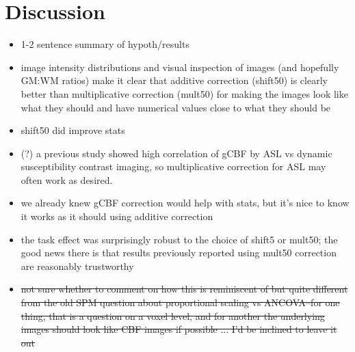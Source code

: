 \section{Discussion}

\begin{itemize}
\item 1-2 sentence summary of hypoth/results
\item image intensity distributions and visual inspection of images (and hopefully GM:WM ratios) make it clear that additive correction (shift50) is clearly better than multiplicative correction (mult50) for making the images look like what they should and have numerical values close to what they should be
\item shift50 did improve stats
\item (?) a previous study showed high correlation of gCBF by ASL vs dynamic susceptibility contrast imaging, so multiplicative correction for ASL may often work as desired.\cite{Knutsson_2010}
\item we already knew gCBF correction would help with stats,\cite{22789842} but it's nice to know it works as it should using additive correction
\item the task effect was surprisingly robust to the choice of shift5 or mult50; the good news there is that results previously reported using  mult50 correction are reasonably trustworthy
\item \sout{not sure whether to comment on how this is reminiscent of but quite different from the old SPM question about proportional scaling vs ANCOVA--for one thing, that is a question on a voxel level, and for another the underlying images should look like CBF images if possible ... I'd be inclined to leave it out}
\end{itemize}

